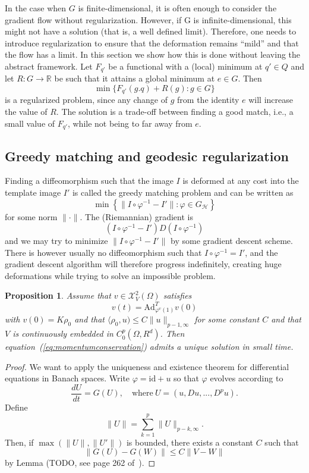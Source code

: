 \documentclass{article}
\theoremstyle{plain}
\newtheorem{prop}[teo]{Proposition}
\theoremstyle{definition}
\numberwithin{equation}{section}
\newcommand{\R}{\ensuremath{\mathbb{R}}}
\newcommand{\id}{\ensuremath{\mathrm{id}}}
\newcommand{\Ad}{\ensuremath{\mathrm{Ad}}}
\begin{document}
In the case when $G$ is finite-dimensional, it is often enough to consider the
gradient flow without regularization. However, if G is infinite-dimensional, this might not have a solution (that is, a well defined limit). Therefore, one needs to introduce regularization to ensure that the deformation remains ``mild'' and that the flow has a limit. In this section we show how this is done without leaving the abstract framework. Let $F_{q'}$ be a functional with a (local) minimum at $q'\in Q$ and let $R:G\to \R$ be such that it attains a global minimum at $e\in G$. Then
\[
\min \{F_{q'}(g.q)+R(g):g\in G\}
\]
is a regularized problem, since any change of $g$ from the identity $e$ will increase the value of $R$. The solution is a trade-off between finding a good match, i.e., a small value of $F_{q'}$, while not being to far away from $e$.

\subsection{Greedy matching and geodesic regularization}
Finding a diffeomorphism such that the image $I$ is deformed at any cost into the template image $I'$ is called the greedy matching problem and can be written as
\[
\min\left\{\|I\circ\varphi^{-1}-I'\| : \varphi\in G_\mathcal{H}\right\}
\]
for some norm $\|\cdot\|$. The (Riemannian) gradient is
\[
(I\circ\varphi^{-1}-I')D(I\circ\varphi^{-1})
\]
and we may try to minimize $\|I\circ\varphi^{-1}-I'\|$ by some gradient descent scheme. There is however usually no diffeomorphism such that $I\circ\varphi^{-1}=I'$, and the gradient descent algorithm will therefore progress indefinitely, creating huge deformations while trying to solve an impossible problem.


\begin{prop}
Assume that $v\in\mathcal{X}_V^2(\Omega)$ satisfies 
%
\begin{equation}
\label{eq:momentumconservation}
v(t)=\Ad_{\varphi^v(1)}^Tv(0)
\end{equation}
%
with $v(0)=K\rho_0$ and that $\langle \rho_0,u)\leq C\|u\|_{p-1,\infty}$ for some constant $C$ and that $V$ is continuously embedded in $C_0^p(\Omega,R^d)$. Then equation~(\ref{eq:momentumconservation}) admits a unique solution in small time.
\end{prop}

\begin{proof}
We want to apply the uniqueness and existence theorem for differential equations in Banach spaces. Write $\varphi=\id+u$ so that $\varphi$ evolves according to
\[
\frac{dU}{dt}=G(U),\quad\mathrm{where\ } U=(u,Du,...,D^pu).
\]
Define
\[
\|U\|=\sum_{k=1}^p \|U\|_{p-k,\infty}.
\]
Then, if $\max(\|U\|,\|U'\|)$ is bounded, there exists a constant $C$ such that
\[
\|G(U)-G(W)\|\leq C\|V-W\|
\]
by Lemma (TODO, see page 262 of~\cite{younes2010shapes}).
\end{proof}
\end{document}
